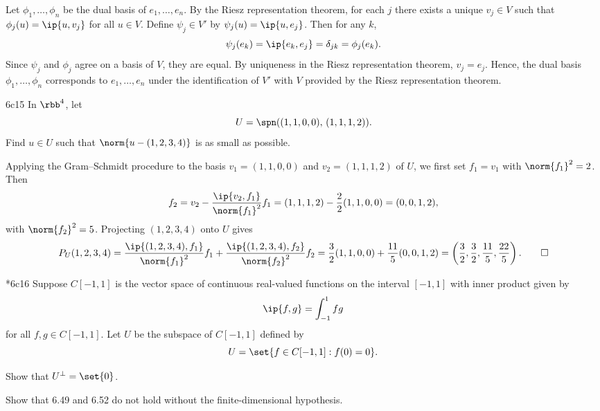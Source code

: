 \begin{sol}
    Let $\phi_1, \ldots, \phi_n$ be the dual basis of $e_1, \ldots, e_n$.
    By the Riesz representation theorem, for each $j$ there exists a unique $v_j \in V$ such that $\phi_j(u) = \ip{u, v_j}$ for all $u \in V$.
    Define $\psi_j \in V'$ by $\psi_j(u) = \ip{u, e_j}$.
    Then for any $k$,
    \[
        \psi_j(e_k) = \ip{e_k, e_j} = \delta_{jk} = \phi_j(e_k).
    \]
    Since $\psi_j$ and $\phi_j$ agree on a basis of $V$, they are equal.
    By uniqueness in the Riesz representation theorem, $v_j = e_j$.
    Hence, the dual basis $\phi_1, \ldots, \phi_n$ corresponds to $e_1, \ldots, e_n$ under the identification of $V'$ with $V$ provided by the Riesz representation theorem.
\end{sol}

\begin{exercise}{6c15}
    In $\rbb^4$, let
    \[
        U = \spn((1, 1, 0, 0),\, (1, 1, 1, 2)).
    \]
    Find $u \in U$ such that $\norm{u - (1, 2, 3, 4)}$ is as small as possible.
\end{exercise}

\begin{sol}
    Applying the Gram--Schmidt procedure to the basis $v_1 = (1, 1, 0, 0)$ and $v_2 = (1, 1, 1, 2)$ of $U$, we first set $f_1 = v_1$ with $\norm{f_1}^2 = 2$.
    Then
    \[
        f_2 = v_2 - \frac{\ip{v_2, f_1}}{\norm{f_1}^2} f_1 = (1, 1, 1, 2) - \frac{2}{2}(1, 1, 0, 0) = (0, 0, 1, 2),
    \]
    with $\norm{f_2}^2 = 5$.
    Projecting $(1, 2, 3, 4)$ onto $U$ gives
    \[
        P_U(1, 2, 3, 4) = \frac{\ip{(1, 2, 3, 4), f_1}}{\norm{f_1}^2} f_1 + \frac{\ip{(1, 2, 3, 4), f_2}}{\norm{f_2}^2} f_2 = \frac{3}{2}(1, 1, 0, 0) + \frac{11}{5}(0, 0, 1, 2) = \left(\frac{3}{2}, \frac{3}{2}, \frac{11}{5}, \frac{22}{5}\right). \qedhere
    \]
\end{sol}

\begin{exercise}*{6c16}
    Suppose $C[-1, 1]$ is the vector space of continuous real-valued functions on the interval $[-1, 1]$ with inner product given by
    \[
        \ip{f, g} = \int_{-1}^{1} fg
    \]
    for all $f, g \in C[-1, 1]$.
    Let $U$ be the subspace of $C[-1, 1]$ defined by
    \[
        U = \set{f \in C[-1, 1] : f(0) = 0}.
    \]
    \begin{subexercises}
        \item Show that $U^\perp = \set{0}$.
        \item Show that 6.49 and 6.52 do not hold without the finite-dimensional hypothesis.
    \end{subexercises}
\end{exercise}

